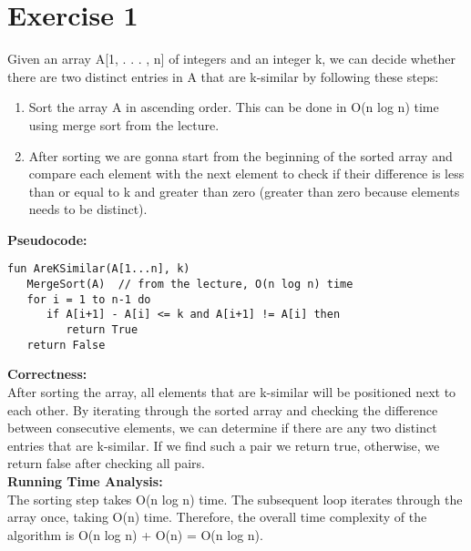 \documentclass{article}
\begin{document}
\section*{Exercise 1}
Given an array A[1, . . . , n] of integers and an integer k, we can decide whether there are two distinct entries in A that are k-similar by following these steps:
\begin{enumerate}
    \item Sort the array A in ascending order. This can be done in O(n log n) time using merge sort from the lecture.
    \item After sorting we are gonna start from the beginning of the sorted array and compare each element with the next element to check if their difference is less than or equal to k and greater than zero (greater than zero because elements needs to be distinct).
\end{enumerate}
\textbf{Pseudocode:}\\
\begin{verbatim}
fun AreKSimilar(A[1...n], k)
   MergeSort(A)  // from the lecture, O(n log n) time
   for i = 1 to n-1 do
      if A[i+1] - A[i] <= k and A[i+1] != A[i] then
         return True
   return False
\end{verbatim}
\textbf{Correctness:}\\
After sorting the array, all elements that are k-similar will be positioned next to each other. By iterating through the sorted array and checking the difference between consecutive elements, we can determine if there are any two distinct entries that are k-similar. If we find such a pair we return true, otherwise, we return false after checking all pairs.\\
\textbf{Running Time Analysis:}\\
The sorting step takes O(n log n) time. The subsequent loop iterates through the array once, taking O(n) time. Therefore, the overall time complexity of the algorithm is O(n log n) + O(n) = O(n log n).
\end{document}
